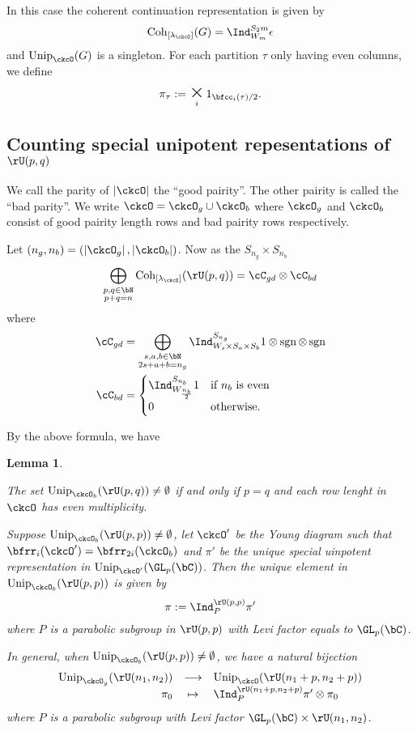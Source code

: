 \documentclass[12pt,a4paper]{amsart}
\def\abs#1{\left|{#1}\right|}
\newcommand{\sgn}{\operatorname{sgn}}
\newcommand{\p}{\mathfrak p}
\numberwithin{equation}{section}
\newtheorem{lem}[thm]{Lemma}
\theoremstyle{remark}
\def\Unip{\mathrm{Unip}}
\def\lamck{\lambda_\ckcO}
\def\Cint#1{\Coh_{[#1]}}
\def\Coh{\mathrm{Coh}}
\begin{document}
In this case the coherent continuation representation is given by  
\[
  \Cint{\lamck}(G) = \Ind_{W_m}^{S_2m}\epsilon 
\]
and $\Unip_\ckcO(G)$ is a singleton. %
For each partition $\tau$ only having even columns, we define 
\[
  \pi_{\tau} := \bigtimes_i 1_{\bfcc_i(\tau)/2}. 
\] 

\subsection{Counting special unipotent repesentations of $\rU(p,q)$}
We call the parity of $\abs{\ckcO}$ the ``good pairity''.  The other pairity is called the ``bad parity''. 
We write $\ckcO = \ckcO_g\cup \ckcO_b$ where $\ckcO_g$ and $\ckcO_b$ consist of good pairity length rows 
and bad pairity rows respectively.  

Let $(n_g,n_b) = (\abs{\ckcO_g},\abs{\ckcO_b})$.
Now as the $S_{n_g}\times S_{n_b}$ 
\[
\bigoplus_{\substack{p,q\in \bN\\p+q=n}} \Cint{\lamck}(\rU(p,q)) = \cC_{gd}\otimes \cC_{bd}
\]
where 
\[
  \begin{split}
 \cC_{gd} &= \bigoplus_{\substack{s,a,b\in \bN\\2s+a+b=n_g}} \Ind_{W_{s}\times S_a\times S_b}^{S_{n_g}}
 1\otimes \sgn\otimes \sgn \\
 \cC_{bd} &= \begin{cases}
  \Ind_{W_{\frac{n_b}{2}}}^{S_{n_b}} 1 & \text{if $n_b$ is even}\\
  0 & \text{otherwise}. 
 \end{cases}
  \end{split}
\]

By the above formula, we have
\begin{lem}
  \begin{enumT}
    \item
The set $\Unip_{\ckcO_b}(\rU(p,q))\neq \emptyset$ if and only if $p=q$ and 
each row lenght in $\ckcO$ has even multiplicity.
\item
Suppose $\Unip_{\ckcO_b}(\rU(p,p))\neq \emptyset$, let $\ckcO'$ be the Young diagram 
such that $\bfrr_i(\ckcO') = \bfrr_{2i}(\ckcO_b)$ and $\pi'$ be the unique special 
uinpotent representation in $\Unip_{\ckcO'}(\GL_{p}(\bC))$. 
Then the unique element in $\Unip_{\ckcO_b}(\rU(p,p))$  is given by 
\[
  \pi := \Ind_{P}^{\rU(p,p)} \pi'
\]
where $P$ is a parabolic subgroup in $\rU(p,p)$ with Levi factor equals
to $\GL_p(\bC)$.
\item 
In general, when $\Unip_{\ckcO_b}(\rU(p,p))\neq \emptyset$, we have a natural bijection 
\[  
  \begin{array}{rcl}
  \Unip_{\ckcO_g}(\rU(n_1,n_2)) &\longrightarrow& \Unip_{\ckcO}(\rU(n_1+p,n_2+p))\\
  \pi_0 & \mapsto & \Ind_P^{\rU(n_1+p,n_2+p)} \pi'\otimes \pi_0
  \end{array}
\]
where $P$ is a parabolic subgroup with Levi factor $\GL_p(\bC)\times \rU(n_1,n_2)$. 
  \end{enumT}
\end{lem}
\end{document}
